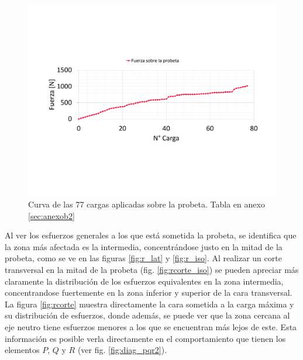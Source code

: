 \begin{figure}[h]
\centering
\includegraphics[width=1\linewidth, trim={2cm 5.2cm 1cm 5.2cm}, clip]{Imagenes/f_step.pdf}
\caption{Curva de las 77 cargas aplicadas sobre la probeta. Tabla en anexo \ref{sec:anexob2}}
\label{fig:f_step}
\end{figure}

Al ver los esfuerzos generales a los que está sometida la probeta, se identifica que la zona más afectada es la intermedia, concentrándose justo en la mitad de la probeta, como se ve en las figuras \ref{fig:r_lat} y \ref{fig:r_iso}. Al realizar un corte transversal en la mitad de la probeta (fig. \ref{fig:rcorte_iso}) se pueden apreciar más claramente la distribución de los esfuerzos equivalentes en la zona intermedia, concentrandose fuertemente en la zona inferior y superior de la cara transversal. La figura \ref{fig:rcorte} muestra directamente la cara sometida a la carga máxima y su distribución de esfuerzos, donde además, se puede ver que la zona cercana al eje neutro tiene esfuerzos menores a los que se encuentran más lejos de este. Esta información es posible verla directamente en el comportamiento que tienen los elementos  $P$, $Q$ y $R$ (ver fig. \ref{fig:diag_pqr2}).


